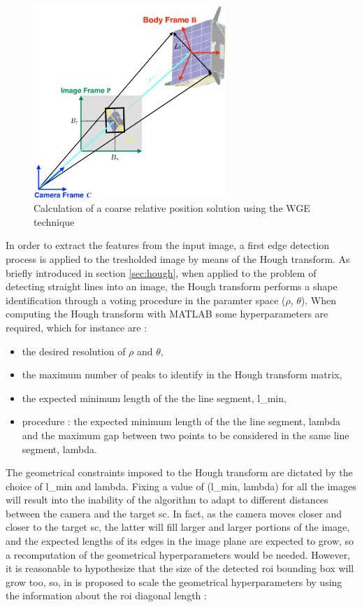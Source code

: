 \begin{figure}[htbp]
  \centering
  \includegraphics[width=0.65\textwidth]{gfx/coarsePoseEstimation.eps}
  \caption{Calculation of a coarse relative position solution using the WGE
technique \cite{Sharma2018}}
  \label{fig:imageProcessingSubsystem}
\end{figure}

In order to extract the features from the input image, a first edge detection process is applied to the tresholded image by means of the Hough transform. As briefly introduced in section \ref{sec:hough}, when applied to the problem of detecting straight lines into an image, the Hough transform performs a shape identification through a voting procedure in the paramter space ($\rho$, $\theta$).
When computing the Hough transform with MATLAB some hyperparameters are required, which for instance are :

\begin{itemize}
\item the desired resolution of $\rho$ and $\theta$, 
\item the maximum number of peaks to identify in the Hough transform matrix,
\item the expected minimum length of the the line segment, \gls{l_min},
\item procedure : the expected minimum length of the the line segment, \gls{lambda} and the maximum gap between two points to be considered in the same line segment, \gls{lambda}.
\end{itemize}

The geometrical constraints imposed to the Hough transform are dictated by the choice of \gls{l_min} and \gls{lambda}. Fixing a value of (\gls{l_min}, \gls{lambda}) for all the images will result into the inability of the algorithm to adapt to different distances between the camera and the target \acrshort{sc}. In fact, as the camera moves closer and closer to the target \acrshort{sc}, the latter will fill larger and larger portions of the image, and the expected lengths of its edges in the image plane are expected to grow, so a recomputation of the geometrical hyperparameters would be needed. However, it is reasonable to hypothesize that the size of the detected \acrshort{roi} bounding box will grow too, so, in \cite{Sharma2018} is proposed to scale the geometrical hyperparameters by using the information about the \acrshort{roi} diagonal length :

